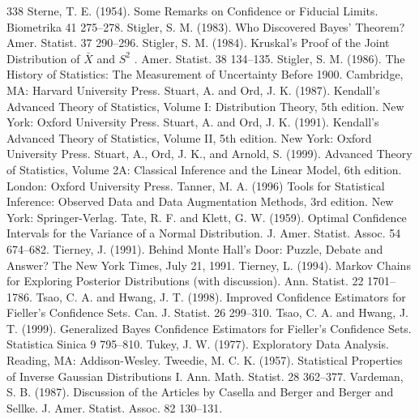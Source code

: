 \begin{thebibliography}{338}
\label{bib:source305} Sterne, T. E. (1954). Some Remarks on Confidence or Fiducial Limits. Biometrika 41 275–278.
\label{bib:source306} Stigler, S. M. (1983). Who Discovered Bayes’ Theorem? Amer. Statist. 37 290–296.
\label{bib:source307} Stigler, S. M. (1984). Kruskal’s Proof of the Joint Distribution of $\bar X$ and $S^2$ . Amer. Statist. 38 134–135.
\label{bib:source308} Stigler, S. M. (1986). The History of Statistics: The Measurement of Uncertainty Before 1900. Cambridge, MA: Harvard University Press.
\label{bib:source309} Stuart, A. and Ord, J. K. (1987). Kendall’s Advanced Theory of Statistics, Volume I: Distribution Theory, 5th edition. New York: Oxford University Press.
\label{bib:source310} Stuart, A. and Ord, J. K. (1991). Kendall’s Advanced Theory of Statistics, Volume II, 5th edition. New York: Oxford University Press.
\label{bib:source311} Stuart, A., Ord, J. K., and Arnold, S. (1999). Advanced Theory of Statistics, Volume 2A: Classical Inference and the Linear Model, 6th edition. London: Oxford University Press.
\label{bib:source312} Tanner, M. A. (1996) Tools for Statistical Inference: Observed Data and Data Augmentation Methods, 3rd edition. New York: Springer-Verlag.
\label{bib:source313} Tate, R. F. and Klett, G. W. (1959). Optimal Confidence Intervals for the Variance of a Normal Distribution. J. Amer. Statist. Assoc. 54 674–682.
\label{bib:source314} Tierney, J. (1991). Behind Monte Hall’s Door: Puzzle, Debate and Answer? The New York Times, July 21, 1991.
\label{bib:source315} Tierney, L. (1994). Markov Chains for Exploring Posterior Distributions (with discussion). Ann. Statist. 22 1701–1786.
\label{bib:source316} Tsao, C. A. and Hwang, J. T. (1998). Improved Confidence Estimators for Fieller’s Confidence Sets. Can. J. Statist. 26 299–310.
\label{bib:source317} Tsao, C. A. and Hwang, J. T. (1999). Generalized Bayes Confidence Estimators for Fieller’s Confidence Sets. Statistica Sinica 9 795–810.
\label{bib:source318} Tukey, J. W. (1977). Exploratory Data Analysis. Reading, MA: Addison-Wesley.
\label{bib:source319} Tweedie, M. C. K. (1957). Statistical Properties of Inverse Gaussian Distributions I. Ann. Math. Statist. 28 362–377.
\label{bib:source320} Vardeman, S. B. (1987). Discussion of the Articles by Casella and Berger and Berger and Sellke. J. Amer. Statist. Assoc. 82 130–131.

\end{thebibliography}
